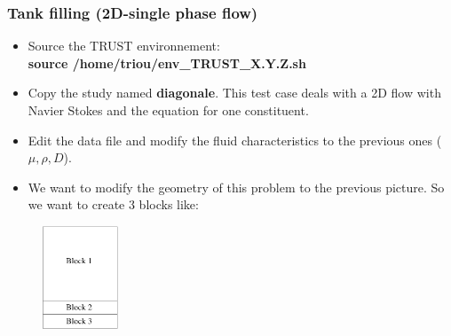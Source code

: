 \documentclass[10pt]{beamer}
\begin{document}
\begin{frame}
\frametitle{Tank filling (2D-single phase flow)}
\begin{block}{}

\begin{itemize}
\item Source the TRUST environnement:\\
\textbf{source /home/triou/env\_TRUST\_X.Y.Z.sh}
\item Copy the study named \textbf{diagonale}. This test case deals with a 2D flow with Navier Stokes and the equation for one constituent.
\item Edit the data file and modify the fluid characteristics to the previous ones ($\mu, \rho, D$).
\item We want to modify the geometry of this problem to the previous picture. So we want to create 3 blocks like:
\end{itemize}

\begin{figure}
\includegraphics[width=0.2\textwidth]{PICTURES/tank2D_2.pdf}
\end{figure}

\end{block}
\end{frame}
\end{document}
